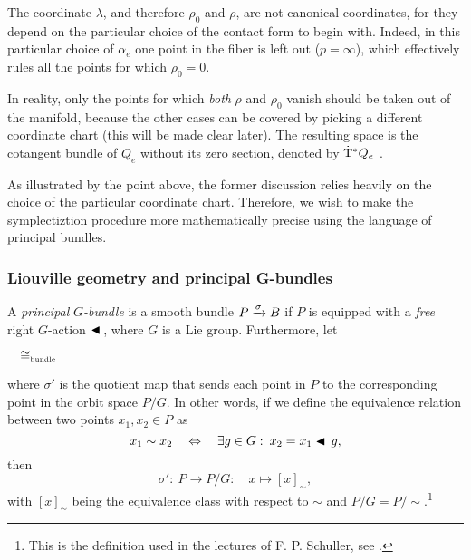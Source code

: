 The coordinate $\lambda$, and therefore $\rho_0$ and $\rho$, are not canonical coordinates, for they depend on the particular choice of the contact form to begin with. Indeed, in this particular choice of $\alpha_e$ one point in the fiber is left out ($p = \infty$), which effectively rules all the points for which $\rho_0 = 0$. 

In reality, only the points for which \emph{both} $\rho$ and $\rho_0$ vanish should be taken out of the manifold, because the other cases can be covered by picking a different coordinate chart (this will be made clear later). The resulting space is the cotangent bundle of $Q_e$ without its zero section, denoted by $ \mathrm{\dot{T}}^*Q_e$ \cite{VanderSchaft2021a,Libermann1987}.

As illustrated by the point above, the former discussion relies heavily on the choice of the particular coordinate chart. Therefore, we wish to make the symplectiztion procedure more mathematically precise using the language of principal bundles.

\subsubsection{Liouville geometry and principal G-bundles}
A \emph{principal} $G$\emph{-bundle} is a smooth bundle $P\xrightarrow[]{\sigma}B$ if $P$ is equipped with a \emph{free} right $G$-action $\blacktriangleleft\,$, where $G$ is a Lie group. Furthermore, let  
\begin{center}
    $\quad \cong_\text{\tiny bundle} \quad $
\end{center}
where $\sigma'$ is the quotient map that sends each point in $P$ to the corresponding point in the orbit space $P/G$. In other words, if we define the equivalence relation between two points $x_1, x_2 \in P$ as
$$ x_1 \sim x_2 \quad \Leftrightarrow \quad \exists g \in G:\: x_2 = x_1 \blacktriangleleft\,g,$$
then 
$$ \sigma':\: P \to P/G:\quad x \mapsto [x]_\sim, $$
with $[x]_\sim$ being the equivalence class with respect to $\sim$ and $P/G = P/\sim$.\footnote{This is the definition used in the lectures of F. P. Schuller, see \cite{Schuller2014}.}

